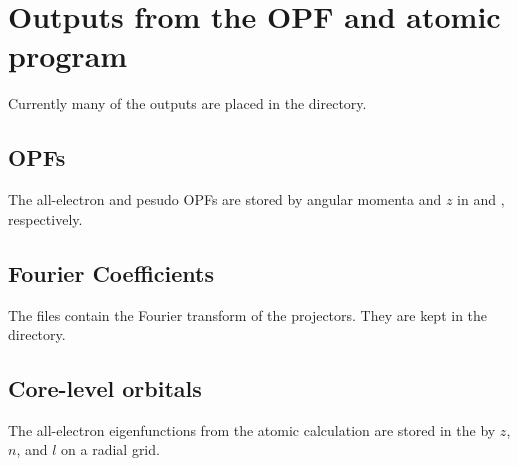 \documentclass[11pt]{report}
\begin{document}


\section{Outputs from the OPF and atomic program}
Currently many of the outputs are placed in the  directory.

\subsection{OPFs}
The all-electron and pesudo OPFs are stored by angular momenta and $z$ in  and , respectively.

\subsection{Fourier Coefficients}
The  files contain the Fourier transform of the projectors. They are kept in the  directory.

\subsection{Core-level orbitals}
The all-electron eigenfunctions from the atomic calculation are stored in the  by $z$, $n$, and $l$ on a radial grid.
\end{document}
